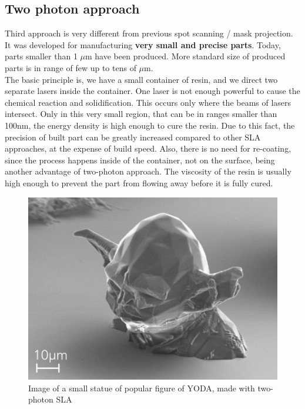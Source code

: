 \documentclass[a4paper, twoside, 11pt]{report}
\begin{document}
\subsection{Two photon approach}
Third approach is very different from previous spot scanning / mask projection. It was developed for manufacturing \textbf{very small and precise parts}. Today, parts smaller than 1 $\mu$m have been produced. More standard size of produced parts is in range of few up to tens of $\mu$m.\\
The basic principle is, we have a small container of resin, and we direct two separate lasers inside the container. One laser is not enough powerful to cause the chemical reaction and solidification. This occurs only where the beams of lasers intersect. Only in this very small region, that can be in ranges smaller than 100nm, the energy density is high enough to cure the resin. Due to this fact, the precision of built part can be greatly increased compared to other SLA approaches, at the expense of build speed. Also, there is no need for re-coating, since the process happens inside of the container, not on the surface, being another advantage of two-photon approach. The viscosity of the resin is usually high enough to prevent the part from flowing away before it is fully cured.
%
\begin{figure}[h]
\centering
\includegraphics[scale=0.5]{yoda}
\caption{Image of a small statue of popular figure of YODA, made with two-photon SLA}
\end{figure}
%
\end{document}
